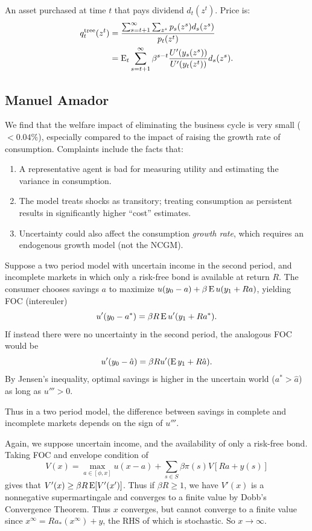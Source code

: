 \documentclass[8pt,letterpaper, landscape]{extarticle} %
\begin{document}
\begin{multicols}{3}
\begin{description}
 An asset purchased at time $ t $ that pays dividend $ d_t (z^t) $. Price is:
\begin{align*}
q_t^{\text{tree}} (z^t) &= \frac{\sum_{s=t+1}^\infty \sum_{z^s} p_{s} (z^s) d_s (z^s)}{p_t(z^t)} \\
&= \operatorname{E}_t \sum_{s=t+1}^\infty \beta^{s-t} \frac{U'(y_{s}(z^s))}{U'(y_t(z^t))} d_s (z^s) .
\end{align*}

\subsection{Manuel Amador}
 We find that the welfare impact of eliminating the business cycle is very small ($ < 0.04\% $), especially compared to the impact of raising the growth rate of consumption. Complaints include the facts that:
\begin{enumerate}
\item A representative agent is bad for measuring utility and estimating the variance in consumption.
\item The model treats shocks as transitory; treating consumption as persistent results in significantly higher ``cost'' estimates.
\item Uncertainty could also affect the consumption \textit{growth rate}, which requires an endogenous growth model (not the NCGM).
\end{enumerate}

 Suppose a two period model with uncertain income in the second period, and incomplete markets in which only a risk-free bond is available at return $ R $. The consumer chooses savings $ a $ to maximize \( u(y_0 - a) + \beta \operatorname{E} u(y_1 + Ra) \), yielding FOC (intereuler)
\[ u'(y_0 - a^*) = \beta R \operatorname{E} u'(y_1 + Ra^*). \]
If instead there were no uncertainty in the second period, the analogous FOC would be
\[ u'(y_0 - \hat{a}) = \beta R u'(\operatorname{E} y_1 + R \hat{a}). \]
By Jensen's inequality, optimal savings is higher in the uncertain world ($ a^* > \hat{a} $) as long as $ u''' > 0 $.

Thus in a two period model, the difference between savings in complete and incomplete markets depends on the sign of $ u''' $.

 Again, we suppose uncertain income, and the availability of only a risk-free bond. Taking FOC and envelope condition of
\[ V(x) = \max_{a \in [\phi , x]} u(x - a) + \sum_{s \in S} \beta \pi (s) V [Ra + y(s)] \]
gives that $ V'(x) \geq \beta R \operatorname{E} [V'(x')] $. Thus if $ \beta R \geq 1 $, we have $ V'(x) $ is a nonnegative supermartingale and converges to a finite value by Dobb's Convergence Theorem. Thus $ x $ converges, but cannot converge to a finite value since $ x^{\infty} = R a_* (x^{\infty}) + y $, the RHS of which is stochastic. So $ x \to \infty $.


\end{description}
\end{multicols}
\end{document}
